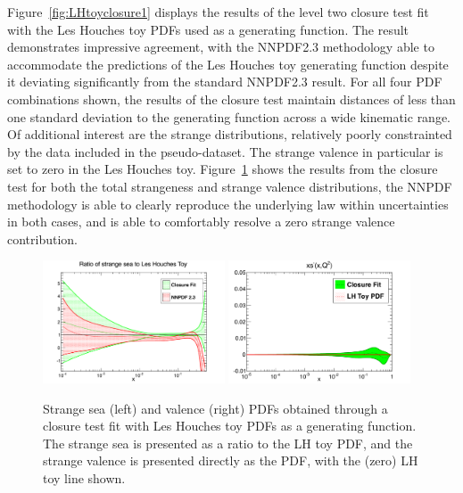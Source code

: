 Figure~\ref{fig:LHtoyclosure1} displays the results of the level two closure test fit with the Les Houches toy PDFs used as a generating function. The result demonstrates impressive agreement, with the NNPDF2.3 methodology able to accommodate the predictions of the Les Houches toy generating function despite it deviating significantly from the standard NNPDF2.3 result. For all four PDF combinations shown, the results of the closure test maintain distances of less than one standard deviation to the generating function across a wide kinematic range. Of additional interest are the strange distributions, relatively poorly constrainted by the data included in the pseudo-dataset. The strange valence in particular is set to zero in the Les Houches toy. Figure~\ref{fig:LHtoyclosure2} shows the results from the closure test for both the total strangeness and strange valence distributions, the NNPDF methodology is able to clearly reproduce the underlying law within uncertainties in both cases, and is able to comfortably resolve a zero strange valence contribution.

\begin{figure}[ht]
\centering
\includegraphics[width=0.48\textwidth]{7-PostLHC/figs/strangesea.pdf}
\includegraphics[width=0.48\textwidth]{7-PostLHC/figs/c1_n64.pdf}
\caption[Strange PDFs obtained through a Closure test fit with toy PDFs as a generating function]{Strange sea (left) and valence (right) PDFs obtained through a closure test fit with Les Houches toy PDFs as a generating function. The strange sea is presented as a ratio to the LH toy PDF, and the strange valence is presented directly as the PDF, with the (zero) LH toy line shown.}
\label{fig:LHtoyclosure2}
\end{figure}

